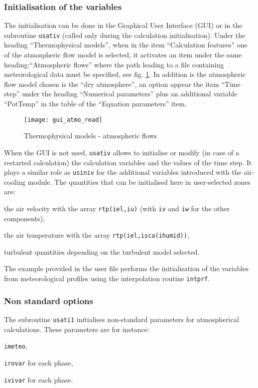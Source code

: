 {{{\subsubsection{Initialisation of the variables}

The initialisation can be done in the Graphical User Interface (GUI)
 or in the subroutine \texttt{usativ} (called only during the calculation
 initialisation). Under the heading ``Thermophysical models'', when in the
 item ``Calculation features'' one of the atmospheric flow model is selected,
 it activates an item under the same heading:``Atmospheric flows'' where the
 path leading to a file containing meteorological data must be specified, see
 fig. \ref {fig:Ini-atmo}. In addition is the atmospheric flow model chosen is
 the ``dry atmosphere'', an option appear the item ``Time step'' under the
 heading ``Numerical parameters'' plus an additional variable ``PotTemp'' 
in the table of the ``Equation parameters'' item.

\begin{figure}[ht]
\begin{center}
\texttt{[image: gui\_atmo\_read]}
\caption{Thermophysical models - atmospheric flows}
\label{fig:Ini-atmo}
\end{center}
\end{figure}

When the GUI is not used, \texttt{usativ} allows to initialise or modify
 (in case of a restarted calculation) the calculation variables and the 
values of the time step. It plays a similar role as \texttt{usiniv} for 
the additional variables introduced with the air-cooling module. The 
quantities that can be initialised here in user-selected zones are:
\begin{list}{-}{}
 \item the air velocity with the array \texttt{rtp(iel,iu)} (with
 \texttt{iv} and \texttt{iw} for the other components),
 \item the air temperature with the array \texttt{rtp(iel,isca(ihumid))},
 \item turbulent quantities depending on the turbulent model selected.
\end{list}
The example provided in the user file performs the initialisation of the 
variables from meteorological profiles using the interpolation routine \texttt{intprf}.

\subsubsection{Non standard options}
The subroutine \texttt{usati1} initialises non-standard parameters for 
atmospherical calculations. These parameters are for instance:
\begin{list}{-}{}
 \item \texttt{imeteo},
 \item \texttt{irovar} for each phase,
 \item \texttt{ivivar} for each phase.
\end{list}

}}}
